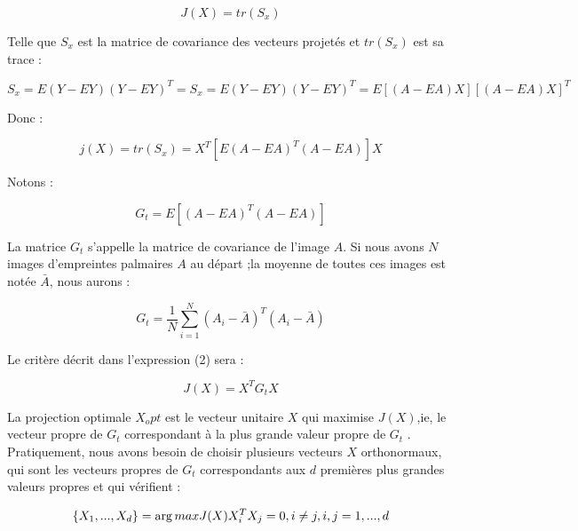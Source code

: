 {\begin{center}
	\begin{equation}\label{eq:chapitre3eq11}
	J(X)=tr(S_x)
	\end{equation}
\end{center}
Telle que $S_x $  est la matrice de covariance des vecteurs projetés et $tr(S_x)$ est sa trace :
\begin{center}
	\begin{equation}\label{eq:chapitre3eq12}
S_x=E(Y-EY)(Y-EY)^T=S_x=E(Y-EY)(Y-EY)^T=E[(A-EA)X][(A-EA)X]^T
\end{equation}
\end{center}
 Donc :
 \begin{center}
	\begin{equation}\label{eq:chapitre3eq13}
j(X)=tr(S_x )=X^T [E(A-EA)^T (A-EA)]X
\end{equation}
\end{center}
Notons :
\begin{center}
	\begin{equation}\label{eq:chapitre3eq14}
G_t=E[(A-EA)^T (A-EA)]
\end{equation}
\end{center}
La matrice $G_t$ s’appelle la matrice de covariance de l’image $A$.
Si nous avons $N$ images d’empreintes palmaires $A$ au départ ;la moyenne de toutes ces images est notée $\bar{A}$, nous aurons :
\begin{center}
	\begin{equation}\label{eq:chapitre3eq15}
G_t=\frac{1}{N}\sum_{i=1}^{N}(A_i-\bar{A})^T(A_i-\bar{A})
\end{equation}
\end{center}
Le critère décrit dans l’expression (2) sera :
\begin{center}
	\begin{equation}\label{eq:chapitre3eq16}
J(X)=X^T G_t X        
\end{equation}
\end{center}
La projection optimale $X_opt$ est le vecteur unitaire $X$ qui maximise $J(X)$,ie, le vecteur propre de $G_t$ correspondant à la plus grande valeur propre de $G_t$ . Pratiquement, nous avons besoin de choisir plusieurs vecteurs $X$ orthonormaux, qui sont les vecteurs propres de $G_t$ correspondants aux $d$ premières plus grandes valeurs propres  et qui vérifient :
\begin{center}
	\begin{equation}\label{eq:chapitre3eq17}
\left \{ X_1,...,X_d \right \}=\arg max J(X)\\
X_i^T X_j=0,i\neq j,i,j=1,...,d      
\end{equation}
\end{center}
}
